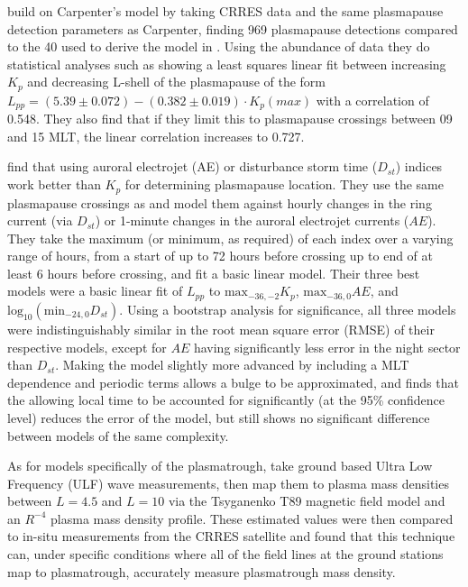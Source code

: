 \cite{Moldwin2002ModelPlasmapause} build on Carpenter's model by taking CRRES data and the same plasmapause detection parameters as Carpenter, finding 969 plasmapause detections compared to the 40 used to derive the model in \cite{Carpenter1992ISEEModel}. Using the abundance of data they do statistical analyses such as showing a least squares linear fit between increasing $K_p$ and decreasing L-shell of the plasmapause of the form $L_{pp}=(5.39\pm 0.072)-(0.382\pm 0.019)\cdot K_p(max)$ with a correlation of 0.548. They also find that if they limit this to plasmapause crossings between 09 and 15 MLT, the linear correlation increases to 0.727.

\cite{OBrien2003EmpiricalPlasmapause} find that using auroral electrojet (AE) or disturbance storm time ($D_{st}$) indices work better than $K_p$ for determining plasmapause location. They use the same plasmapause crossings as \cite{Moldwin2002ModelPlasmapause} and model them against hourly changes in the ring current (via $D_{st}$) or 1-minute changes in the auroral electrojet currents ($AE$). They take the maximum (or minimum, as required) of each index over a varying range of hours, from a start of up to 72 hours before crossing up to end of at least 6 hours before crossing, and fit a basic linear model. Their three best models were a basic linear fit of $L_{pp}$ to $\text{max}_{-36,-2}K_p$, $\text{max}_{-36,0}AE$, and $\text{log}_{10}(\text{min}_{-24,0}D_{st})$. Using a bootstrap analysis for significance, all three models were indistinguishably similar in the root mean square error (RMSE) of their respective models, except for $AE$ having significantly less error in the night sector than $D_{st}$. Making the model slightly more advanced by including a MLT dependence and periodic terms allows a bulge to be approximated, and finds that the allowing local time to be accounted for significantly (at the 95\% confidence level) reduces the error of the model, but still shows no significant difference between models of the same complexity.

As for models specifically of the plasmatrough, \cite{Lotoaniu1999PlasmaMassDensity} take ground based Ultra Low Frequency (ULF) wave measurements, then map them to plasma mass densities between $L=4.5$ and $L=10$ via the Tsyganenko T89 magnetic field model and an $R^{-4}$ plasma mass density profile. These estimated values were then compared to in-situ measurements from the CRRES satellite and found that this technique can, under specific conditions where all of the field lines at the ground stations map to plasmatrough, accurately measure plasmatrough mass density. 

